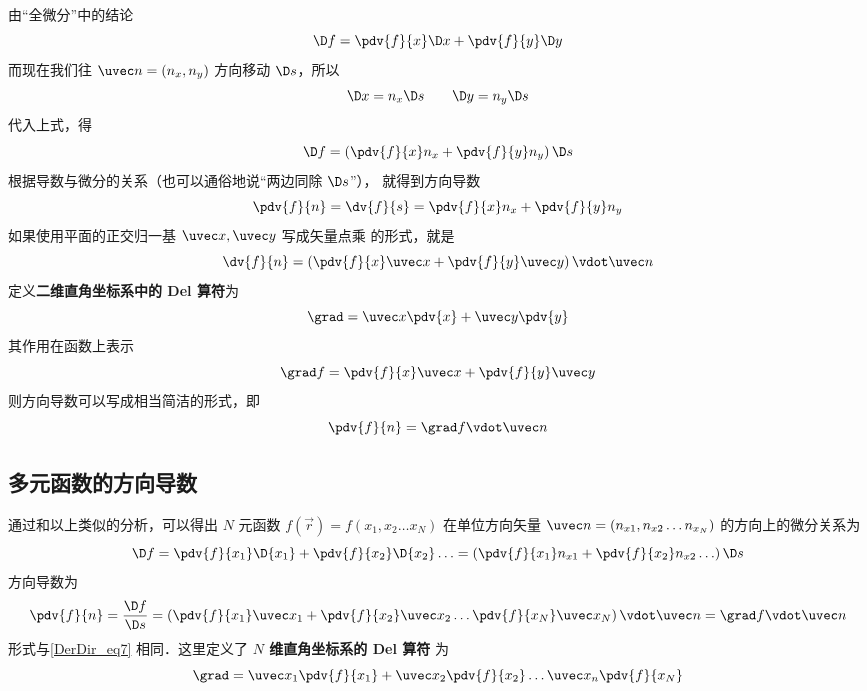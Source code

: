 由“全微分”中的结论
\begin{equation}
\D f = \pdv{f}{x} \D x + \pdv{f}{y}\D y
\end{equation}
而现在我们往 $\uvec n = \left( {{n_x},{n_y}} \right)$ 方向移动 $\D s$，所以
\begin{equation}
\D x = n_x \D s \qquad \D y = n_y \D s
\end{equation}
代入上式，得
\begin{equation}
\D f =  \left(\pdv{f}{x} n_x + \pdv{f}{y} n_y \right) \D s
\end{equation}
根据导数与微分的关系（也可以通俗地说“两边同除 $\D s$”）， 就得到方向导数
\begin{equation}
\pdv{f}{n} = \dv{f}{s} = \pdv{f}{x} n_x + \pdv{f}{y} n_y
\end{equation}
如果使用平面的正交归一基 $\uvec x, \uvec y$ 写成矢量点乘 的形式，就是
\begin{equation}
\dv{f}{n} = \left( {\pdv{f}{x}\uvec x + \pdv{f}{y}\uvec y} \right) \vdot \uvec n
\end{equation} 
定义\textbf{二维直角坐标系中的 Del 算符}为
\begin{equation}
\grad  = \uvec x\pdv{x} + \uvec y\pdv{y}
\end{equation}
其作用在函数上表示
\begin{equation}
\grad f = \pdv{f}{x}\uvec x + \pdv{f}{y}\uvec y
\end{equation} 
则方向导数可以写成相当简洁的形式，即
\begin{equation}\label{DerDir_eq7}
\pdv{f}{n} = \grad f \vdot \uvec n
\end{equation} 

\subsection{多元函数的方向导数}
通过和以上类似的分析，可以得出 $N$ 元函数 $f(\vec r) = f(x_1,x_2\dots x_N)$ 在单位方向矢量 $\uvec n = \left( {{n_{x1}},{n_{x2}}\dots{n_{x_N}}} \right)$ 的方向上的微分关系为
\begin{equation}
\D f = \pdv{f}{x_1}\D {x_1} + \pdv{f}{x_2}\D {x_2}\ldots = \left( {\pdv{f}{x_1}n_{x1} + \pdv{f}{x_2}n_{x2}\dots} \right)\D s
\end{equation}
方向导数为
\begin{equation}
\pdv{f}{n} = \frac{\D f}{\D s} = \left( \pdv{f}{x_1}\uvec x_1 + \pdv{f}{x_2}\uvec x_2\ldots  \pdv{f}{x_N}\uvec x_N \right) \vdot \uvec n = \grad f \vdot \uvec n
\end{equation} 
形式与\autoref{DerDir_eq7} 相同．这里定义了\textbf{ $N$ 维直角坐标系的 Del 算符} 为
\begin{equation}
\grad  = {\uvec x_1}\pdv{f}{x_1} + {\uvec x_2}\pdv{f}{x_2}\dots{\uvec x_n}\pdv{f}{x_N}
\end{equation}


